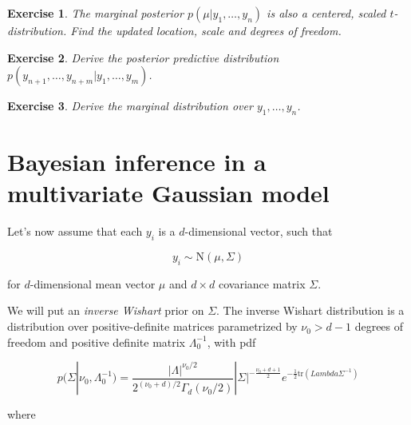 \documentclass[twoside]{article}
\newcounter{lecnum}
\newtheorem{exercise}{Exercise}[lecnum]
\begin{document}
\begin{exercise}

  The marginal posterior $p(\mu|y_1,\dots, y_n)$ is also a centered, scaled $t$-distribution. Find the updated location, scale and degrees of freedom.

\end{exercise}



\begin{exercise}

  Derive the posterior predictive distribution $p(y_{n+1},\dots, y_{n+m}|y_1,\dots, y_{m})$.

\end{exercise}



\begin{exercise}

  Derive the marginal distribution over $y_1,\dots, y_n$.

\end{exercise}











\section{Bayesian inference in a multivariate Gaussian model}



Let's now assume that each $y_i$ is a $d$-dimensional vector, such that



$$y_i \sim \mbox{N}(\mu, \Sigma)$$

for $d$-dimensional mean vector $\mu$ and $d\times d$ covariance matrix $\Sigma$.



We will put an \textit{inverse Wishart} prior on $\Sigma$. The inverse Wishart distribution is a distribution over positive-definite matrices parametrized by $\nu_0>d-1$ degrees of freedom and  positive definite matrix $\Lambda_0^{-1}$, with pdf



$$p(\Sigma|\nu_0, \Lambda_0^{-1}) = \frac{|\Lambda|^{\nu_0/2}}{2^{(\nu_0 +d)/2}\Gamma_d(\nu_0/2)}|\Sigma|^{-\frac{\nu_0+d+1}{2}}e^{-\frac{1}{2}\mbox{tr}(Lambda\Sigma^{-1})}$$



where
\end{document}
